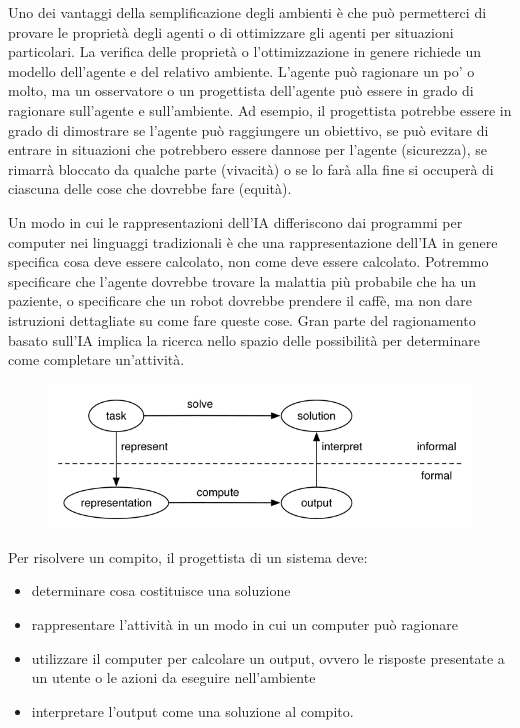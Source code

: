 \documentclass[a4paper]{extarticle}
\begin{document}
Uno dei vantaggi della semplificazione degli ambienti è che può permetterci di provare le proprietà degli agenti o di ottimizzare gli agenti per situazioni particolari. La verifica delle proprietà o l'ottimizzazione in genere richiede un modello dell'agente e del relativo ambiente. L'agente può ragionare un po' o molto, ma un osservatore o un progettista dell'agente può essere in grado di ragionare sull'agente e sull'ambiente. Ad esempio, il progettista potrebbe essere in grado di dimostrare se l'agente può raggiungere un obiettivo, se può evitare di entrare in situazioni che potrebbero essere dannose per l'agente (sicurezza), se rimarrà bloccato da qualche parte (vivacità) o se lo farà alla fine si occuperà di ciascuna delle cose che dovrebbe fare (equità).

Un modo in cui le rappresentazioni dell'IA differiscono dai programmi per computer nei linguaggi tradizionali è che una rappresentazione dell'IA in genere specifica cosa deve essere calcolato, non come deve essere calcolato. Potremmo specificare che l'agente dovrebbe trovare la malattia più probabile che ha un paziente, o specificare che un robot dovrebbe prendere il caffè, ma non dare istruzioni dettagliate su come fare queste cose. Gran parte del ragionamento basato sull'IA implica la ricerca nello spazio delle possibilità per determinare come completare un'attività.


\begin{figure}[h]
\begin{center}
\includegraphics[scale=.65]{ruoloAgenti.png}
\end{center}
\end{figure}
Per risolvere un compito, il progettista di un sistema deve:
\begin{itemize}
\item determinare cosa costituisce una soluzione
\item rappresentare l'attività in un modo in cui un computer può ragionare
\item utilizzare il computer per calcolare un output, ovvero le risposte presentate a un utente o le azioni da eseguire nell'ambiente
\item interpretare l'output come una soluzione al compito.
\end{itemize}
\end{document}
